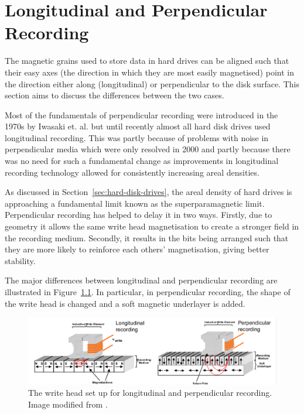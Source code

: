 \chapter{Longitudinal and Perpendicular Recording}
\label{sec:long-perp-record}

The magnetic grains used to store data in hard drives can be aligned such that
their easy axes (the direction in which they are most easily magnetised) point
in the direction either along (longitudinal) or perpendicular to the disk
surface. This section aims to discuss the differences between the two cases.

Most of the fundamentals of perpendicular recording were introduced in the 1970s
by Iwasaki et. al.\cite{Piramanayagam2009a} but until recently almost all hard
disk drives used longitudinal recording.  This was partly because of problems
with noise in perpendicular media which were only resolved in
2000\cite{Piramanayagam2009a} and partly because there was no need for such a
fundamental change as improvements in longitudinal recording technology allowed
for consistently increasing areal densities.

As discussed in Section~\ref{sec:hard-disk-drives}, the areal density of hard
drives is approaching a fundamental limit known as the superparamagnetic
limit. Perpendicular recording has helped to delay it in two ways. Firstly, due
to geometry it allows the same write head magnetisation to create a stronger
field in the recording medium. Secondly, it results in the bits being arranged
such that they are more likely to reinforce each others' magnetisation, giving
better stability.

The major differences between longitudinal and perpendicular recording are
illustrated in Figure~\ref{fig:Longitudinal-perpendicular}. In particular, in
perpendicular recording, the shape of the write head is changed and a soft magnetic
underlayer is added.

\begin{figure}[!ht]
  \center
  \includegraphics[width=1\textwidth]{./images/perphead}
  \caption{The write head set up for longitudinal and perpendicular recording.
    Image modified from
    \cite{LongitudinalPerpDiagram}.}
  \label{fig:Longitudinal-perpendicular}
\end{figure}

